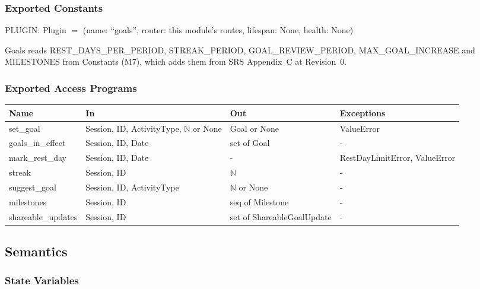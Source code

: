 \documentclass[12pt, titlepage]{article}
\begin{document}
\subsubsection{Exported Constants}

\noindent PLUGIN: Plugin $=$ (name: ``goals'', router: this module's routes,
lifespan: None, health: None)

\medskip
\noindent Goals reads REST\_DAYS\_PER\_PERIOD, STREAK\_PERIOD,
GOAL\_REVIEW\_PERIOD, MAX\_GOAL\_INCREASE and MILESTONES from Constants (M7),
which adds them from SRS Appendix~C at Revision~0.

\subsubsection{Exported Access Programs}

\begin{center}
\small
\setlength{\tabcolsep}{3pt}
\begin{tabular}{>{\raggedright\arraybackslash}p{3.9cm}
  >{\raggedright\arraybackslash}p{3.7cm}
  >{\raggedright\arraybackslash}p{3.4cm}
  >{\raggedright\arraybackslash}p{4.3cm}}
\toprule
\textbf{Name} & \textbf{In} & \textbf{Out} & \textbf{Exceptions} \\
\midrule
set\_goal & Session, ID, ActivityType, $\mathbb{N}$ or None & Goal or None &
ValueError \\
goals\_in\_effect & Session, ID, Date & set of Goal & - \\
mark\_rest\_day & Session, ID, Date & - & RestDayLimitError, ValueError \\
streak & Session, ID & $\mathbb{N}$ & - \\
suggest\_goal & Session, ID, ActivityType & $\mathbb{N}$ or None & - \\
milestones & Session, ID & seq of Milestone & - \\
shareable\_updates & Session, ID & set of ShareableGoalUpdate & - \\
\bottomrule
\end{tabular}
\end{center}

\subsection{Semantics}

\subsubsection{State Variables}
\end{document}
